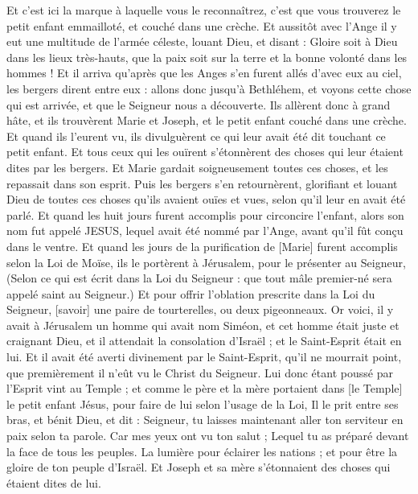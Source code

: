 \begin{multicols}{2}
Et c'est ici la marque à laquelle vous le reconnaîtrez, c'est que vous trouverez le petit enfant emmailloté, et couché dans une crèche.
Et aussitôt avec l'Ange il y eut une multitude de l'armée céleste, louant Dieu, et disant :
Gloire soit à Dieu dans les lieux très-hauts, que la paix soit sur la terre et la bonne volonté dans les hommes !
Et il arriva qu'après que les Anges s'en furent allés d'avec eux au ciel, les bergers dirent entre eux : allons donc jusqu'à Bethléhem, et voyons cette chose qui est arrivée, et que le Seigneur nous a découverte.
Ils allèrent donc à grand hâte, et ils trouvèrent Marie et Joseph, et le petit enfant couché dans une crèche.
Et quand ils l'eurent vu, ils divulguèrent ce qui leur avait été dit touchant ce petit enfant.
Et tous ceux qui les ouïrent s'étonnèrent des choses qui leur étaient dites par les bergers.
Et Marie gardait soigneusement toutes ces choses, et les repassait dans son esprit.
Puis les bergers s'en retournèrent, glorifiant et louant Dieu de toutes ces choses qu'ils avaient ouïes et vues, selon qu'il leur en avait été parlé.
Et quand les huit jours furent accomplis pour circoncire l'enfant, alors son nom fut appelé JESUS, lequel avait été nommé par l'Ange, avant qu'il fût conçu dans le ventre.
Et quand les jours de la purification de [Marie] furent accomplis selon la Loi de Moïse, ils le portèrent à Jérusalem, pour le présenter au Seigneur,
(Selon ce qui est écrit dans la Loi du Seigneur : que tout mâle premier-né sera appelé saint au Seigneur.)
Et pour offrir l'oblation prescrite dans la Loi du Seigneur, [savoir] une paire de tourterelles, ou deux pigeonneaux.
Or voici, il y avait à Jérusalem un homme qui avait nom Siméon, et cet homme était juste et craignant Dieu, et il attendait la consolation d'Israël ; et le Saint-Esprit était en lui.
Et il avait été averti divinement par le Saint-Esprit, qu'il ne mourrait point, que premièrement il n'eût vu le Christ du Seigneur.
Lui donc étant poussé par l'Esprit vint au Temple ; et comme le père et la mère portaient dans [le Temple] le petit enfant Jésus, pour faire de lui selon l'usage de la Loi,
Il le prit entre ses bras, et bénit Dieu, et dit :
Seigneur, tu laisses maintenant aller ton serviteur en paix selon ta parole.
Car mes yeux ont vu ton salut ;
Lequel tu as préparé devant la face de tous les peuples.
La lumière pour éclairer les nations ; et pour être la gloire de ton peuple d'Israël.
Et Joseph et sa mère s'étonnaient des choses qui étaient dites de lui.

\end{multicols}

